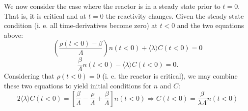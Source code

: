 We now consider the case where the reactor is in a steady state prior to $t = 0$. That is, it is critical and at $t = 0$ the reactivity changes. Given the steady state condition (i. e. all time-derivatives become zero) at $t < 0$ and the two equations above:
\begin{equation}
	\left( \frac{\rho(t < 0) - \beta}{\Lambda} \right) n(t < 0) + \langle \lambda \rangle C(t < 0) = 0
\end{equation}
\begin{equation}
	\frac{\beta}{\Lambda} n(t < 0) - \langle \lambda \rangle C(t < 0) = 0.
\end{equation}
Considering that $\rho(t < 0) = 0$ (i. e. the reactor is critical), we may combine these two equations to yield initial conditions for $n$ and $C$:
\begin{equation}
	2\langle \lambda \rangle C(t < 0) = \left[ \frac{\beta}{\Lambda} - \frac{\rho}{\Lambda} + \frac{\beta}{\Lambda} \right]n(t < 0) \Rightarrow C(t < 0) = \frac{\beta}{\lambda \Lambda} n(t < 0)
\end{equation}

